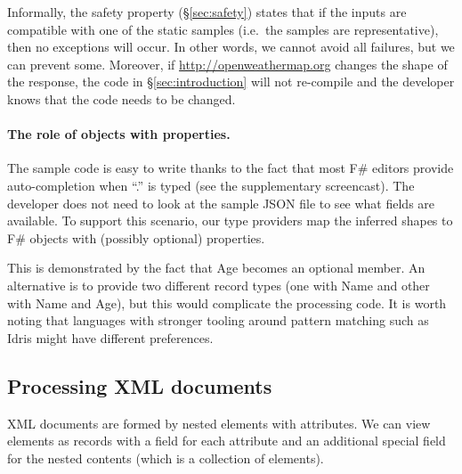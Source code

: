 \documentclass[10pt,preprint,blind,clearpagebib]{sigplanconf}
\newcommand{\ident}[1]{\textnormal{\sffamily #1}}
\begin{document}
Informally, the safety property (\S\ref{sec:safety}) states that if the inputs are compatible
with one of the static samples (i.e.~the samples are representative), then no exceptions will 
occur. In other words, we cannot avoid all failures, but we can prevent some. Moreover, if 
\url{http://openweathermap.org} changes the shape of the response, the code in \S\ref{sec:introduction}
will not re-compile and the developer knows that the code needs to be changed. 

\paragraph{The role of objects with properties.}
The sample code is easy to write thanks to the fact that most F\# editors provide auto-completion
when ``.'' is typed (see the supplementary screencast). The developer does not need to look at the 
sample JSON file to see what fields are available. To support this scenario, our type providers 
map the inferred shapes to F\# objects with (possibly optional) properties.

This is demonstrated by the fact that \ident{Age} becomes an optional member.
An alternative is to provide two different record types (one with \ident{Name} and other with 
\ident{Name} and \ident{Age}), but this would complicate the processing code.
It is worth noting that languages with stronger tooling around pattern matching
such as Idris \cite{idris-tools} might have different preferences.


\subsection{Processing XML documents}
\label{sec:providers-xml}

XML documents are formed by nested elements with attributes. We can view elements as records with 
a field for each attribute and an additional special field for the nested contents (which is a 
collection of elements).
\end{document}
